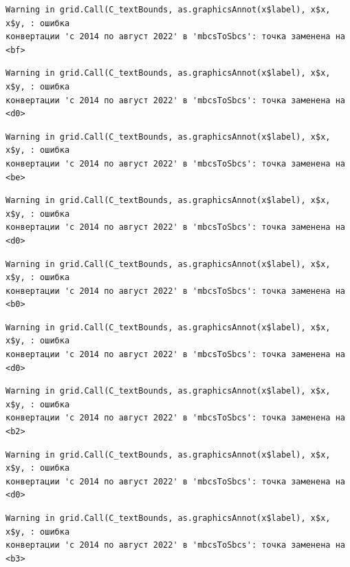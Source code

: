 \documentclass[
  letterpaper,
  DIV=11,
  numbers=noendperiod]{scrreprt}
\begin{document}
\begin{verbatim}
Warning in grid.Call(C_textBounds, as.graphicsAnnot(x$label), x$x, x$y, : ошибка
конвертации 'с 2014 по август 2022' в 'mbcsToSbcs': точка заменена на <bf>
\end{verbatim}

\begin{verbatim}
Warning in grid.Call(C_textBounds, as.graphicsAnnot(x$label), x$x, x$y, : ошибка
конвертации 'с 2014 по август 2022' в 'mbcsToSbcs': точка заменена на <d0>
\end{verbatim}

\begin{verbatim}
Warning in grid.Call(C_textBounds, as.graphicsAnnot(x$label), x$x, x$y, : ошибка
конвертации 'с 2014 по август 2022' в 'mbcsToSbcs': точка заменена на <be>
\end{verbatim}

\begin{verbatim}
Warning in grid.Call(C_textBounds, as.graphicsAnnot(x$label), x$x, x$y, : ошибка
конвертации 'с 2014 по август 2022' в 'mbcsToSbcs': точка заменена на <d0>
\end{verbatim}

\begin{verbatim}
Warning in grid.Call(C_textBounds, as.graphicsAnnot(x$label), x$x, x$y, : ошибка
конвертации 'с 2014 по август 2022' в 'mbcsToSbcs': точка заменена на <b0>
\end{verbatim}

\begin{verbatim}
Warning in grid.Call(C_textBounds, as.graphicsAnnot(x$label), x$x, x$y, : ошибка
конвертации 'с 2014 по август 2022' в 'mbcsToSbcs': точка заменена на <d0>
\end{verbatim}

\begin{verbatim}
Warning in grid.Call(C_textBounds, as.graphicsAnnot(x$label), x$x, x$y, : ошибка
конвертации 'с 2014 по август 2022' в 'mbcsToSbcs': точка заменена на <b2>
\end{verbatim}

\begin{verbatim}
Warning in grid.Call(C_textBounds, as.graphicsAnnot(x$label), x$x, x$y, : ошибка
конвертации 'с 2014 по август 2022' в 'mbcsToSbcs': точка заменена на <d0>
\end{verbatim}

\begin{verbatim}
Warning in grid.Call(C_textBounds, as.graphicsAnnot(x$label), x$x, x$y, : ошибка
конвертации 'с 2014 по август 2022' в 'mbcsToSbcs': точка заменена на <b3>
\end{verbatim}
\end{document}
